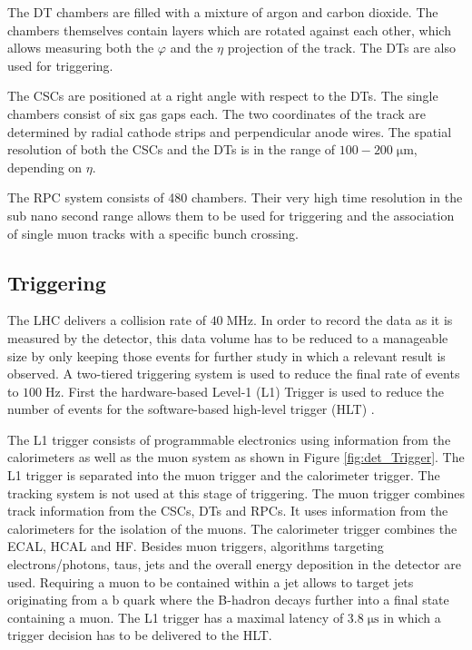 The DT chambers are filled with a mixture of argon and carbon dioxide. The chambers themselves contain layers which are rotated against each other,
which allows measuring both the $\varphi$ and the $\eta$ projection of the track. The DTs are also used for triggering.

The CSCs are positioned at a right angle with respect to the DTs. The single chambers consist of six gas gaps each. The two coordinates of the track are determined by radial cathode strips and perpendicular anode wires.
The spatial resolution of both the CSCs and the DTs is in the range of $100-200 \; \si{\micro \meter}$, depending on $\eta$.

The RPC system consists of 480 chambers. Their very high time resolution in the sub nano second range allows them to be used for triggering and the association of single muon tracks with a specific bunch crossing.

\subsection{Triggering}
\label{set:det_trigger}

The LHC delivers a collision rate of $40 \;\si{\mega \hertz}$. In order to record the data as it is measured by the detector, this data volume has to be reduced to a manageable size by
only keeping those events for further study in which a relevant result is observed. A two-tiered triggering system is used to reduce the final rate of events to $100 \;\si{\hertz}$.
First the hardware-based Level-1 (L1) Trigger is used to reduce the number of events for the software-based high-level trigger (HLT) \cite{Bayatyan:706847,Tapper:2013yva}.

The L1 trigger consists of programmable electronics using information from the calorimeters as well as the muon system as shown in Figure \ref{fig:det_Trigger}. The L1 trigger is separated into the muon trigger and the calorimeter trigger. The tracking system is not used at this stage of triggering.
 The muon trigger combines track information from the CSCs, DTs and RPCs. It uses information from the calorimeters for the isolation of the muons.
The calorimeter trigger combines the ECAL, HCAL and HF. Besides muon triggers, algorithms targeting electrons/photons, taus, jets and the overall energy deposition in the detector are used. Requiring a muon to be contained within a jet allows to target jets originating from a b quark where the B-hadron decays further into a final state containing a muon.
The L1 trigger has a maximal latency of $3.8  \;\si{\micro \second}$ in which a trigger decision has to be delivered to the HLT.

